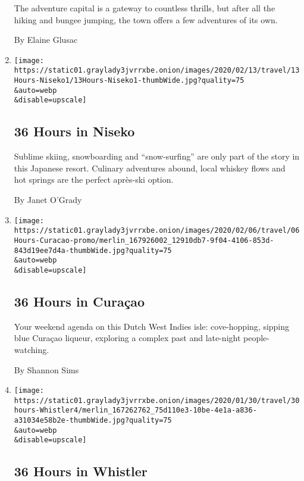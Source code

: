 \begin{enumerate}
  The adventure capital is a gateway to countless thrills, but after all
  the hiking and bungee jumping, the town offers a few adventures of its
  own.

  By Elaine Glusac
\item
  \href{/2020/02/13/travel/what-to-do-36-hours-in-niseko-japan.html}{}

  \texttt{[image: https://static01.graylady3jvrrxbe.onion/images/2020/02/13/travel/13Hours-Niseko1/13Hours-Niseko1-thumbWide.jpg?quality=75\\\&auto=webp\\\&disable=upscale]}

  \hypertarget{36-hours-in-niseko}{%
  \subsection{36 Hours in Niseko}\label{36-hours-in-niseko}}

  Sublime skiing, snowboarding and ``snow-surfing'' are only part of the
  story in this Japanese resort. Culinary adventures abound, local
  whiskey flows and hot springs are the perfect après-ski option.

  By Janet O'Grady
\item
  \href{/2020/02/06/travel/what-to-do-36-hours-in-curacao.html}{}

  \texttt{[image: https://static01.graylady3jvrrxbe.onion/images/2020/02/06/travel/06Hours-Curacao-promo/merlin\_167926002\_12910db7-9f04-4106-853d-843d19ee7d4a-thumbWide.jpg?quality=75\\\&auto=webp\\\&disable=upscale]}

  \hypertarget{36-hours-in-curauxe7ao}{%
  \subsection{36 Hours in Curaçao}\label{36-hours-in-curauxe7ao}}

  Your weekend agenda on this Dutch West Indies isle: cove-hopping,
  sipping blue Curaçao liqueur, exploring a complex past and late-night
  people-watching.

  By Shannon Sims
\item
  \href{/2020/01/30/travel/what-to-do-36-hours-in-whistler-british-columbia.html}{}

  \texttt{[image: https://static01.graylady3jvrrxbe.onion/images/2020/01/30/travel/30hours-Whistler4/merlin\_167262762\_75d110e3-10be-4e1a-a836-a31034e58b2e-thumbWide.jpg?quality=75\\\&auto=webp\\\&disable=upscale]}

  \hypertarget{36-hours-in-whistler}{%
  \subsection{36 Hours in Whistler}\label{36-hours-in-whistler}}


\end{enumerate}
